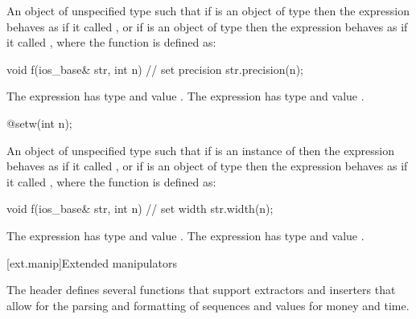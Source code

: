 \begin{itemdescr}
\pnum
\returns
An object of unspecified type such that if
is an object of type
then the expression
behaves as if it called
,
or if
is an object of type
then the expression
behaves as if it called
, where the function  is defined as:

\begin{codeblock}
void f(ios_base& str, int n) {
  // set precision
  str.precision(n);
}
\end{codeblock}

The expression
has type
and value
.
The expression
has type
and value
.
\end{itemdescr}

%
\begin{itemdecl}
@\unspec@ setw(int n);
\end{itemdecl}

\begin{itemdescr}
\pnum
\returns
An object of unspecified type such that if
is an instance of
then the expression
behaves as if it called
,
or if
is an object of type
then the expression
behaves as if it called
, where the function  is defined as:

\begin{codeblock}
void f(ios_base& str, int n) {
  // set width
  str.width(n);
}
\end{codeblock}

The expression
has type
and value
.
The expression
has type
and value
.
\end{itemdescr}

[ext.manip]{Extended manipulators}

\pnum
The header  defines several functions that support extractors and inserters that allow for the
parsing and formatting of sequences and values for money and time.

